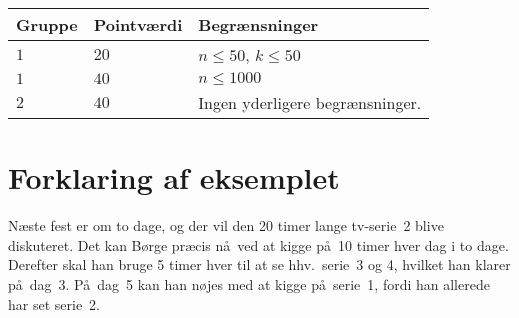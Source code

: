 \noindent
\begin{tabular}{| l | l | l |}
\hline
Gruppe & Pointværdi & Begrænsninger \\ \hline
$1$   & $20$       & $n \leq 50$, $k \leq 50$ \\ \hline
$1$   & $40$       & $n \leq 1000$ \\ \hline
$2$   & $40$       & Ingen yderligere begrænsninger. \\ \hline
\end{tabular}

\section*{Forklaring af eksemplet}
Næste fest er om to dage, og der vil den 20 timer lange tv-serie~2 blive diskuteret.
Det kan Børge præcis nå ved at kigge på 10 timer hver dag i to dage.
Derefter skal han bruge 5 timer hver til at se hhv.\ serie~3 og 4, hvilket han klarer på dag~3.
På dag~5 kan han nøjes med at kigge på serie~1, fordi han allerede har set serie~2.
